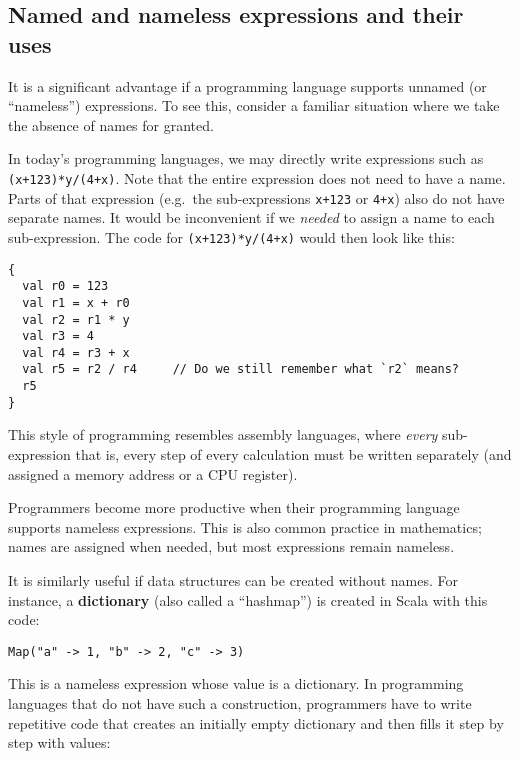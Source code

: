 \subsection{Named and nameless expressions and their uses}

It is a significant advantage if a programming language supports unnamed
(or \textsf{``}nameless\textsf{''}) expressions. To see this, consider a familiar
situation where we take the absence of names for granted.

In today\textsf{'}s programming languages, we may directly write expressions
such as \texttt{}\lstinline!(x+123)*y/(4+x)!. Note that the entire
expression does not need to have a name. Parts of that expression
(e.g.~the sub-expressions \texttt{}\lstinline!x+123! or \lstinline!4+x!)
also do not have separate names. It would be inconvenient if we \emph{needed}
to assign a name to each sub-expression. The code for \lstinline!(x+123)*y/(4+x)!
would then look like this:

\begin{lstlisting}
{
  val r0 = 123
  val r1 = x + r0
  val r2 = r1 * y
  val r3 = 4 
  val r4 = r3 + x
  val r5 = r2 / r4     // Do we still remember what `r2` means?
  r5
}
\end{lstlisting}

This style of programming resembles assembly languages,
where \emph{every} sub-expression \textemdash{} that is, every step
of every calculation \textemdash{} must be written separately (and
assigned a memory address or a CPU register).

Programmers become more productive when their programming language
supports nameless expressions. This is also common practice in mathematics;
names are assigned when needed, but most expressions remain nameless.

It is similarly useful if data structures can be created without names.
For instance, a \textbf{dictionary} (also called
a \textsf{``}hashmap\textsf{''}) is created in Scala with this code:
\begin{lstlisting}
Map("a" -> 1, "b" -> 2, "c" -> 3)
\end{lstlisting}
This is a nameless expression whose value is a dictionary. In programming
languages that do not have such a construction, programmers have to
write repetitive code that creates an initially empty dictionary and
then fills it step by step with values:

